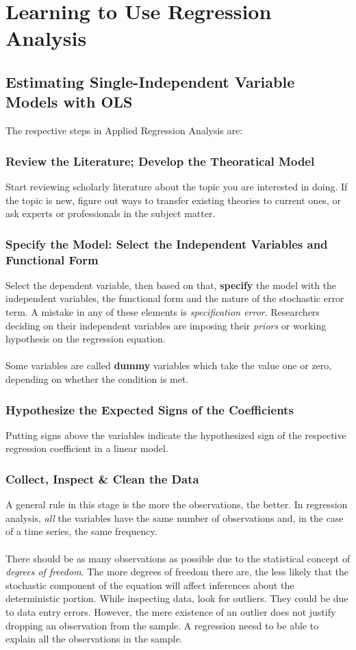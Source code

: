 \documentclass[11pt]{article}
\begin{document}
\section{Learning to Use Regression Analysis}
\subsection{Estimating Single-Independent Variable Models with OLS}
The respective steps in Applied Regression Analysis are:
\subsubsection{Review the Literature; Develop the Theoratical Model}
Start reviewing scholarly literature about the topic you are interested in doing. If the topic is new, figure out ways to transfer existing theories to current ones, or ask experts or professionals in the subject matter.
\subsubsection{Specify the Model: Select the Independent Variables and Functional Form}
Select the dependent variable, then based on that, \textbf{specify} the model with the independent variables, the functional form and the nature of the stochastic error term. A mistake in any of these elements is \textit{specification error}. Researchers deciding on their independent variables are imposing their \textit{priors} or working hypothesis on the regression equation.\\ \\
Some variables are called \textbf{dummy} variables which take the value one or zero, depending on whether the condition is met.
\subsubsection{Hypothesize the Expected Signs of the Coefficients}
Putting signs above the variables indicate the hypothesized sign of the respective regression coefficient in a linear model. 
\subsubsection{Collect, Inspect \& Clean the Data}
A general rule in this stage is the more the observations, the better. In regression analysis, \textit{all} the variables have the same number of observations and, in the case of a time series, the same frequency.\\ \\
There should be as many observations as possible due to the statistical concept of \textit{degrees of freedom}. The more degrees of freedom there are, the less likely that the stochastic component of the equation will affect inferences about the deterministic portion.
While inspecting data, look for outliers. They could be due to data entry errors. However, the mere existence of an outlier does not justify dropping an observation from the sample. A regression neesd to be able to explain all the observations in the sample.
\end{document}

